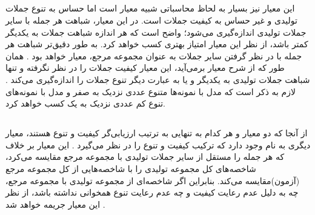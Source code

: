 \subsection{\selfbleu{}}
این معیار نیز بسیار به لحاظ محاسباتی شبیه معیار \bleu{} است اما حساس به تنوع جملات تولیدی و غیر حساس به کیفیت جملات است. در این معیار، شباهت هر جمله با سایر جملات تولیدی اندازه‌گیری می‌شود؛ واضح است که هر اندازه شباهت جملات به یکدیگر کمتر باشد، از نظر این معیار امتیاز بهتری کسب خواهد کرد. به طور دقیق‌تر شباهت \bleu{} هر جمله با در نظر گرفتن سایر جملات به عنوان مجموعه مرجع، معیار \selfbleu{} خواهد بود \cite{seqgan}. همان طور که از شرح معیار بر‌می‌آید، این معیار کیفیت جملات را در نظر نگرفته و تنها شباهت جملات تولیدی به یکدیگر و یا به عبارت دیگر تنوع جملات را اندازه‌گیری می‌کند \cite{jointly}. لازم به ذکر است که مدل با نمونه‌ها متنوع عددی نزدیک به صفر و مدل با نمونه‌های تنوع کم عددی نزدیک به یک کسب خواهد کرد.
\subsection{\jaccard{}}
از آنجا که دو معیار \bleu{} و \selfbleu{} هر کدام به تنهایی به ترتیب ارزیابی‌گر کیفیت و تنوع هستند، معیار دیگری به نام \jaccard{} وجود دارد که ترکیب کیفیت و تنوع را در نظر می‌گیرد \cite{jointly}. این معیار بر خلاف \bleu{} که هر جمله را مستقل از سایر جملات تولیدی با مجموعه مرجع مقایسه می‌کرد، شاخصه‌های کل مجموعه تولیدی را با شاخصه‌هایی از کل مجموعه مرجع (آزمون)‌مقایسه می‌کند. بنابراین اگر شاخصه‌ای از مجموعه تولیدی با مجموعه مرجع، چه به دلیل عدم رعایت کیفیت و چه عدم رعایت تنوع همخوانی نداشته باشد، از نظر این معیار جریمه خواهد شد \cite{jointly}.
